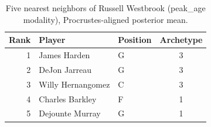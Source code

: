 \begin{table}[htbp]
  \centering\small
  \begin{tabular}{rllc}
    \toprule
    Rank & Player & Position & Archetype \\
    \midrule
    1 & James Harden & G & 3 \\
    2 & DeJon Jarreau & G & 3 \\
    3 & Willy Hernangomez & C & 3 \\
    4 & Charles Barkley & F & 1 \\
    5 & Dejounte Murray & G & 1 \\
    \bottomrule
  \end{tabular}
  \caption{Five nearest neighbors of Russell Westbrook (peak_age modality), Procrustes-aligned posterior mean.}
  \label{tab:Russell_Westbrook_neighbors_peak_age}
\end{table}

